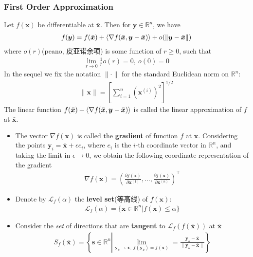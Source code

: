 \subsubsection{First Order Approximation}
Let $f(\bm x)$ be differentiable at $\bar {\bm x}$. Then for $\bm y\in \mathbb{R}^n$, we have
\begin{align*}
    f(\bm y)=f(\bar {\bm x})+\braket{\nabla f(\bar{\bm x},\bm y-\bar{\bm x})}+o(\| \bm y-\bar{\bm x} \|)
\end{align*}
where $o(r)$(peano, 皮亚诺余项) is some function of $r\ge 0$, such that
\begin{align*}
    \lim_{r\to 0}\frac{1}{r}o(r)=0,\ o(0)=0
\end{align*}
In the sequel we fix the notation $\|\cdot \|$ for the standard Euclidean norm on $\mathbb{R}^n$: 
\begin{align*}
    \|\bm x\|=\left[ \sum_{i=1}^n\left( \bm x^{(i)} \right)^2 \right]^{1/2}
\end{align*}
The linear function $f(\bar {\bm x})+\braket{\nabla f(\bar{\bm x},\bm y-\bar{\bm x})}$ is called the linear approximation of $f$ at $\bar{\bm x}$. 


\begin{itemize}
    \item The vector $\nabla f(\bm x)$ is called the \textbf{gradient} of function $f$ at $\bm x$. 
    \subitem Considering the points $\bm y_i=\bar{\bm x}+\epsilon e_i$, where $e_i$ is the $i$-th coordinate vector in $\mathbb{R}^n$, and taking the limit in $\epsilon\to 0$, we obtain the following coordinate representation of the gradient
    \begin{align*}
        \nabla f(\bm x)=\left( \frac{\partial f(\bm x)}{\partial \bm x^{(1)}},\dots,\frac{\partial f(\bm x)}{\partial \bm x^{(n)}} \right)^\top
    \end{align*}
    \item Denote by $\mathcal{L}_f(\alpha)$ the \textbf{level set}(等高线) of $f(\bm x)$:
    \begin{align*}
        \mathcal{L}_f(\alpha)=\{ \bm x\in \mathbb{R}^n|f(\bm x)\le \alpha \}
    \end{align*}
    \item Consider the \textit{set} of directions that are \textbf{tangent} to $\mathcal{L}_f(f(\bar{\bm x}))$ at $\bar{\bm x}$
    \begin{align*}
        S_f(\bar{\bm x})=\left\{ \bm s\in \mathbb{R}^n \left| \lim_{\bm y_k\to \bar{\bm x},\ f(\bm y_k)=f(\bar{\bm x})}=\frac{\bm y_k-\bar{\bm x}}{\|\bm y_k-\bar{\bm x}\|} \right. \right\}
    \end{align*}
\end{itemize}

